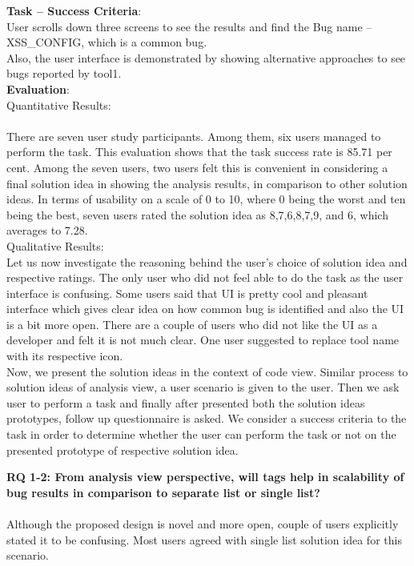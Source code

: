 \textbf{Task – Success Criteria}: \\

User scrolls down three screens to see the results and find the Bug name – XSS\_CONFIG, which is a common bug. \\

Also, the user interface is demonstrated by showing alternative approaches to see bugs reported by tool1. \\

\textbf{Evaluation}: \\

Quantitative Results: \\ \\
There are seven user study participants. Among them, six users managed to perform the task. This evaluation shows that the task success rate is 85.71 per cent. Among the seven users, two users felt this is convenient in considering a final solution idea in showing the analysis results, in comparison to other solution ideas. In terms of usability on a scale of 0 to 10, where 0 being the worst and ten being the best, seven users rated the solution idea as 8,7,6,8,7,9, and 6, which averages to 7.28. \\

Qualitative Results: \\

Let us now investigate the reasoning behind the user’s choice of solution idea and respective ratings. The only user who did not feel able to do the task as the user interface is confusing. Some users said that UI is pretty cool and pleasant interface which gives clear idea on how common bug is identified and also the UI is a bit more open. There are a couple of users who did not like the UI as a developer and felt it is not much clear. One user suggested to replace tool name with its respective icon. \\

Now, we present the solution ideas in the context of code view. Similar process to solution ideas of analysis view, a user scenario is given to the user. Then we ask user to perform a task and finally after presented both the solution ideas prototypes, follow up questionnaire is asked. We consider a success criteria to the task in order to determine whether the user can perform the task or not on the presented prototype of respective solution idea. \\

\begin{myboxi}{{\textbf{RQ 1-2: From analysis view perspective, will tags help in scalability of bug results in comparison to separate list or single list?}}}
\\ \\ Although the proposed design is novel and more open, couple of users explicitly stated it to be confusing. Most users agreed with single list solution idea for this scenario.
\end{myboxi}

